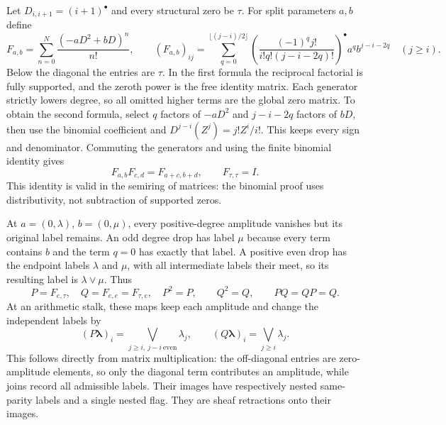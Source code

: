 \documentclass[11pt,a4paper]{article}
\theoremstyle{definition}\newtheorem{definition}[theorem]{Definition}
\begin{document}
Let $D_{i,i+1}=(i+1)^\bullet$ and every structural zero be $\tau$.
For split parameters $a,b$ define
\begin{equation}\tag{CLS1}
 F_{a,b}=\sum_{n=0}^{N}\frac{(-aD^2+bD)^n}{n!},\qquad
 (F_{a,b})_{ij}=\sum_{q=0}^{\lfloor (j-i)/2\rfloor}
 \left(\frac{(-1)^qj!}{i!q!(j-i-2q)!}\right)^\bullet
 a^qb^{j-i-2q}\quad(j\ge i).
\end{equation}
Below the diagonal the entries are $\tau$. In the first formula
the reciprocal factorial is fully supported, and the zeroth
power is the free identity matrix. Each generator strictly lowers
degree, so all omitted higher terms are the global zero matrix.
To obtain the second formula, select $q$ factors of $-aD^2$ and
$j-i-2q$ factors of $bD$, then use the binomial coefficient and
$D^{j-i}(Z^j)=j!Z^i/i!$. This keeps every sign and denominator.
Commuting the generators and using the finite binomial identity gives
\begin{equation}\tag{CLS2}
 F_{a,b}F_{c,d}=F_{a+c,b+d},\qquad F_{\tau,\tau}=I.
\end{equation}
This identity is valid in the semiring of matrices: the binomial
proof uses distributivity, not subtraction of supported zeros.

At $a=(0,\lambda)$, $b=(0,\mu)$, every positive-degree amplitude
vanishes but its original label remains. An odd degree drop has
label $\mu$ because every term contains $b$ and the term $q=0$
has exactly that label. A positive even drop has the endpoint
labels $\lambda$ and $\mu$, with all intermediate labels their
meet, so its resulting label is $\lambda\vee\mu$. Thus
\begin{equation}\tag{CLS3}
 P=F_{e,\tau},\quad Q=F_{e,e}=F_{\tau,e},\quad
 P^2=P,\qquad Q^2=Q,\qquad PQ=QP=Q.
\end{equation}
At an arithmetic stalk, these maps keep each amplitude and change
the independent labels by
\begin{equation}\tag{CLS4}
 (P\boldsymbol\lambda)_i=
       \bigvee_{j\ge i,\ j-i\ \mathrm{even}}\lambda_j,
 \qquad (Q\boldsymbol\lambda)_i=\bigvee_{j\ge i}\lambda_j.
\end{equation}
This follows directly from matrix multiplication: the off-diagonal
entries are zero-amplitude elements, so only the diagonal term
contributes an amplitude, while joins record all admissible labels.
Their images have respectively nested same-parity labels and a
single nested flag. They are sheaf retractions onto their images.
\end{document}
